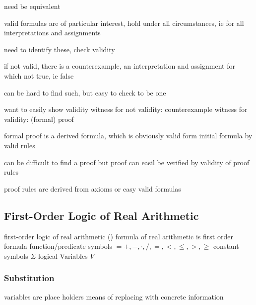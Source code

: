                 need be equivalent

                valid formulas are of particular interest, hold under all circumstances, ie for all interpretations and assignments

                need to identify these, check validity

                if not valid, there is a counterexample, an interpretation and assignment for which not true, ie false

                can be hard to find such, but easy to check to be one

                want to easily show validity
                witness for not validity: counterexample
                witness for validity: (formal) proof

                formal proof is a derived formula, which is obviously valid
                form initial formula by valid rules

                can be difficult to find a proof
                but proof can easil be verified by validity of proof rules

                proof rules are derived from axioms or easy valid formulas

        \subsection{First-Order Logic of Real Arithmetic}
            \label{sec:FOL-R}

            first-order logic of real arithmetic (\FOLR)
            formula of real arithmetic
            is first order formula
            function/predicate symbols $ = {+,-,\cdot,/,=,<,\leq,>,\geq}$
            constant symbols $\Sigma$
            logical Variables $V$


        \subsubsection{Substitution}
        \label{sec:substitution}

        variables are place holders
        means of replacing with concrete information
